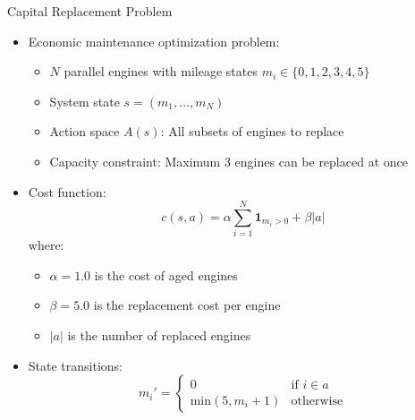 \documentclass[10pt]{beamer}
\renewcommand{\min}{\text{min}}
\begin{document}
\begin{frame}{Capital Replacement Problem}
    \begin{itemize}
        \item Economic maintenance optimization problem:
        \begin{itemize}
            \item $N$ parallel engines with mileage states $m_i \in \{0,1,2,3,4,5\}$
            \item System state $s = (m_1,...,m_N)$
            \item Action space $A(s)$: All subsets of engines to replace
            \item Capacity constraint: Maximum 3 engines can be replaced at once
        \end{itemize}
        \vspace{0.2cm}
        \item Cost function:
        \begin{equation}
            c(s,a) = \alpha \sum_{i=1}^{N} \mathbf{1}_{m_i > 0} + \beta |a|
        \end{equation}
        where:
        \begin{itemize}
            \item $\alpha=1.0$ is the cost of aged engines
            \item $\beta=5.0$ is the replacement cost per engine
            \item $|a|$ is the number of replaced engines
        \end{itemize}
        \vspace{0.2cm}
        \item State transitions:
        \begin{equation}
            m_i' =
            \begin{cases}
                0 & \text{if } i \in a \\
                \min(5, m_i+1) & \text{otherwise}
            \end{cases}
        \end{equation}
    \end{itemize}
\end{frame}

\end{document}
